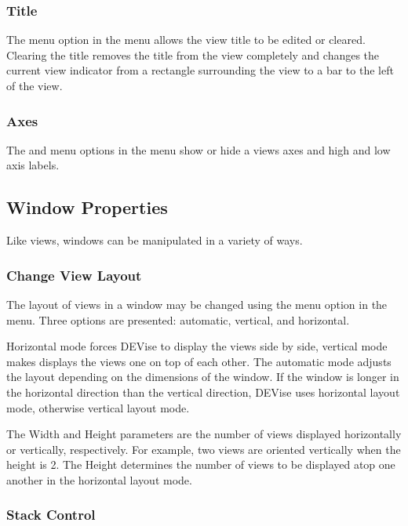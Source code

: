 \subsubsection{Title}

The  menu option in the  menu allows the view title to be
edited or cleared. Clearing the title removes the title from the view completely
and changes the current view indicator from a rectangle surrounding the view to
a bar to the left of the view.

\subsubsection{Axes}

The  and  menu options in the
 menu show or hide a views axes and high and low axis labels.


\subsection{Window Properties}

Like views, windows can be manipulated in a variety of ways.

\subsubsection{Change View Layout}

The layout of views in a window may be changed using the  menu
option in the  menu. Three options are presented: automatic,
vertical, and horizontal.

Horizontal mode forces DEVise to display the views side by side, vertical mode
makes displays the views one on top of each other. The automatic mode adjusts
the layout depending on the dimensions of the window. If the window is longer in
the horizontal direction than the vertical direction, DEVise uses
horizontal layout mode, otherwise vertical layout mode.

The Width and Height parameters are the number of views displayed horizontally
or vertically, respectively. For example, two views are oriented vertically when
the height is 2. The Height determines the number of views to be displayed atop
one another in the horizontal layout mode.

\subsubsection{Stack Control}

